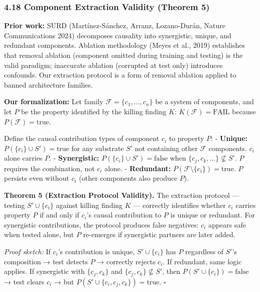 \documentclass[
  11pt,
]{article}
\begin{document}
\subsubsection{4.18 Component Extraction Validity (Theorem
5)}\label{component-extraction-validity-theorem-5}

\textbf{Prior work:} SURD (Martínez-Sánchez, Arranz, Lozano-Durán,
Nature Communications 2024) decomposes causality into synergistic,
unique, and redundant components. Ablation methodology (Meyes et al.,
2019) establishes that removal ablation (component omitted during
training and testing) is the valid paradigm; inaccurate ablation
(corrupted at test only) introduces confounds. Our extraction protocol
is a form of removal ablation applied to banned architecture families.

\textbf{Our formalization:} Let family
\(\mathcal{F} = \{c_1, \ldots, c_n\}\) be a system of components, and
let \(P\) be the property identified by the killing finding \(K\):
\(K(\mathcal{F}) = \text{FAIL}\) because
\(P(\mathcal{F}) = \text{true}\).

Define the causal contribution types of component \(c_i\) to property
\(P\): - \textbf{Unique:} \(P(\{c_i\} \cup S') = \text{true}\) for any
substrate \(S'\) not containing other \(\mathcal{F}\) components.
\(c_i\) alone carries \(P\). - \textbf{Synergistic:}
\(P(\{c_i\} \cup S') = \text{false}\) when
\(\{c_j, c_k, \ldots\} \not\subseteq S'\). \(P\) requires the
combination, not \(c_i\) alone. - \textbf{Redundant:}
\(P(\mathcal{F} \setminus \{c_i\}) = \text{true}\). \(P\) persists even
without \(c_i\) (other components also produce \(P\)).

\textbf{Theorem 5 (Extraction Protocol Validity).} The extraction
protocol --- testing \(S' \cup \{c_i\}\) against killing finding \(K\)
--- correctly identifies whether \(c_i\) carries property \(P\) if and
only if \(c_i\)'s causal contribution to \(P\) is unique or redundant.
For synergistic contributions, the protocol produces false negatives:
\(c_i\) appears safe when tested alone, but \(P\) re-emerges if
synergistic partners are later added.

\emph{Proof sketch:} If \(c_i\)'s contribution is unique,
\(S' \cup \{c_i\}\) has \(P\) regardless of \(S'\)'s composition → test
detects \(P\) → correctly rejects \(c_i\). If redundant, same logic
applies. If synergistic with \(\{c_j, c_k\}\) and
\(\{c_j, c_k\} \not\subseteq S'\), then
\(P(S' \cup \{c_i\}) = \text{false}\) → test clears \(c_i\) → but
\(P(S' \cup \{c_i, c_j, c_k\}) = \text{true}\). \(\square\)
\end{document}
